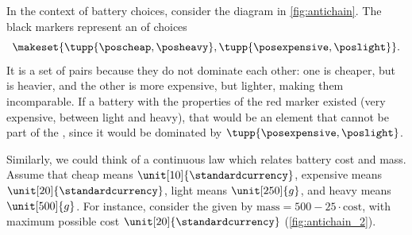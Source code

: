 \clearpage

\begin{marginfigure}
    \centering
    \caption{Example of discrete .
    }
    \label{fig:antichain}
\end{marginfigure}
\begin{example}
    In the context of battery choices, consider the diagram in \cref{fig:antichain}.
    The black markers represent an  of choices
    \begin{equation}\label{eq:example-battery-antichain}
        \makeset{
            \tupp{\poscheap,\posheavy},
            \tupp{\posexpensive,\poslight}
        }.
    \end{equation}
    It is a set of pairs because they do not dominate each other: one is cheaper, but is heavier, and the other is more expensive, but lighter, making them incomparable.
    If a battery with the properties of the red marker existed (very expensive, between light and heavy), that would be an element that cannot be part of the , since it would be dominated by $\tupp{\posexpensive,\poslight}$.
    \begin{marginfigure}
        \centering
        \caption{Example of continuous .}
        \label{fig:antichain_2}
    \end{marginfigure}
    Similarly, we could think of a continuous law which relates battery cost and mass.
    Assume that cheap means $\unit[10]{\standardcurrency}$, expensive means $\unit[20]{\standardcurrency}$, light means $\unit[250]{g}$, and heavy means $\unit[500]{g}$.
    For instance, consider the  given by $\text{mass}=500-25\cdot \text{cost}$, with maximum possible cost $\unit[20]{\standardcurrency}$ (\cref{fig:antichain_2}).
\end{example}

\vspace{5cm}

\begin{marginfigure}
    \centering
    \caption{}
    \label{fig:chain_divisor_poset}
\end{marginfigure}

\begin{marginfigure}
    \centering
    \caption{}
    \label{fig:antichain_divisor_poset}
\end{marginfigure}

